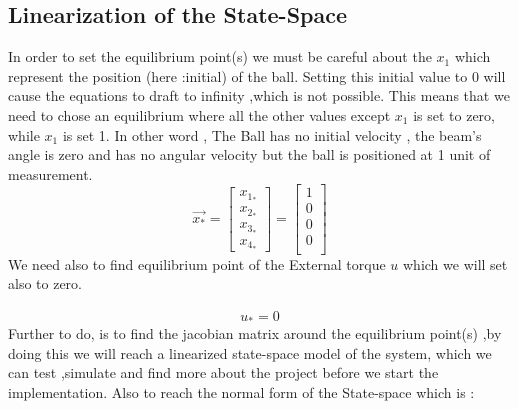 \documentclass{article}
\begin{document}
\subsection{Linearization of the State-Space}
In order to set the equilibrium point(s) we must be careful about the $x_1$ which represent the position (here :initial) of the ball.
Setting this initial value to 0 will cause the equations to draft to infinity ,which is not possible.
This means that we need to chose an equilibrium where all the other values except $x_1$ is set to zero, while $x_1$ is set 1.
In other word , The Ball has no initial velocity , the beam's angle is zero and has no angular velocity but the ball is positioned at 1 unit of measurement.
\begin{equation}
	\vec{x_*} =
	\begin{bmatrix}
		x_{\text{$1_*$}} \\
		x_{\text{$2_*$}} \\
		x_{\text{$3_*$}} \\
		x_{\text{$4_*$}}
	\end{bmatrix}=
	\begin{bmatrix}
		1 \\
		0 \\
		0 \\
		0 \\
	\end{bmatrix}
\end{equation}
We need also to find equilibrium point of the External torque $u$ which we will set also to zero.

\begin{equation}
	\begin{split}
		u_* = 0
	\end{split}
\end{equation}
Further to do, is to find the jacobian matrix around the equilibrium point(s) ,by doing this we will reach a linearized state-space model of the system,
which we can test ,simulate and find more about the project before we start the implementation.
Also to reach the normal form of the State-space which is :
\end{document}
